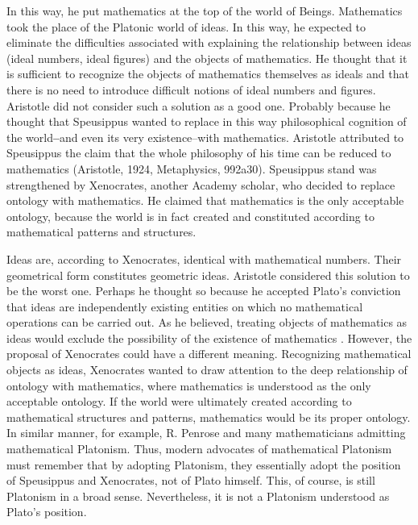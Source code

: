 \documentclass[a4paper]{article}
\begin{document}
In this way, he put mathematics at the top of the %
world of Beings. Mathematics took the place of the Platonic world of ideas. In this way, he expected to eliminate the
difficulties associated with explaining the relationship between ideas (ideal numbers, ideal figures) and the objects
of mathematics. He thought that it is sufficient to recognize the objects of mathematics themselves as ideals and that
there is no need to introduce difficult notions of ideal numbers and figures. Aristotle did not consider such a
solution as a good one. Probably because he thought that Speusippus wanted to replace in this way philosophical
cognition of the world\textbf{–}and even its very existence–with mathematics. Aristotle attributed to Speusippus the
claim that the whole philosophy of his time can be reduced to mathematics \label{ref:RNDjZZARv4iL3}(Aristotle, 1924,
Metaphysics, 992a30). Speusippus stand was strengthened by Xenocrates, another Academy scholar, who decided to replace
ontology with mathematics. He claimed that mathematics is the only acceptable ontology, because the world is in fact
created and constituted according to mathematical patterns and structures.

Ideas are, according to Xenocrates, identical with mathematical numbers. Their geometrical form constitutes geometric
ideas. Aristotle considered this solution to be the worst one. Perhaps he thought so because he accepted Plato’s
conviction that ideas are independently existing entities on which no mathematical operations can be carried out. As he
believed, treating objects of mathematics as ideas would exclude the possibility of the existence of mathematics%
. However, the proposal of Xenocrates could have a different meaning. Recognizing mathematical objects as ideas,
Xenocrates wanted to draw attention to the deep relationship of ontology with mathematics, where mathematics is
understood as the only acceptable ontology. If the world were ultimately created according to mathematical structures
and patterns, mathematics would be its proper ontology. %
In similar manner, for example, R. Penrose and many mathematicians admitting mathematical Platonism. Thus, modern
advocates of mathematical Platonism must remember that by adopting Platonism, they essentially adopt the position of
Speusippus and Xenocrates, not of Plato himself. This, of course, is still Platonism in a broad sense. Nevertheless, it
is not a Platonism understood as Plato’s position.
\end{document}
